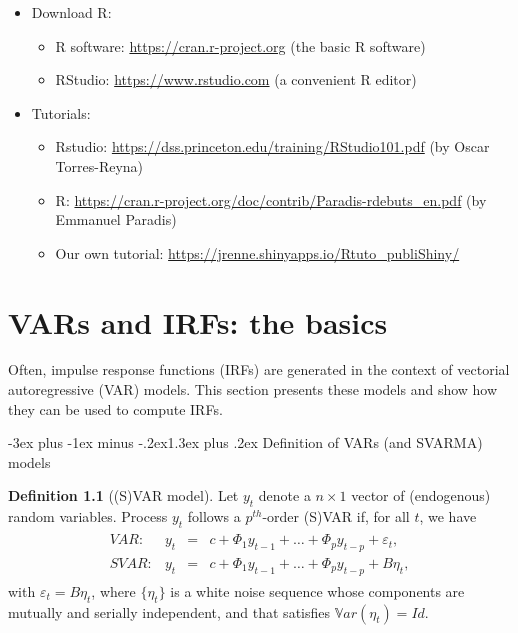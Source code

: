 \documentclass[
  11pt,
]{book}
\makeatletter
\providecommand{\tightlist}{%
  \setlength{\itemsep}{0pt}\setlength{\parskip}{0pt}}
\renewcommand\section{\@startsection{section}{1}{\z@}
  {-3ex plus -1ex minus -.2ex}{1.3ex plus .2ex}
  {\normalfont\Large\bfseries\color{TextbookInk}}}
\theoremstyle{definition}
\newtheorem{definition}{Definition}[chapter]
\theoremstyle{definition}
\theoremstyle{definition}
\theoremstyle{definition}
\theoremstyle{remark}
\makeatother
\begin{document}
\begin{itemize}
\item
  Download R:

  \begin{itemize}
  \tightlist
  \item
    R software: \url{https://cran.r-project.org} (the basic R software)
  \item
    RStudio: \url{https://www.rstudio.com} (a convenient R editor)
  \end{itemize}
\item
  Tutorials:

  \begin{itemize}
  \tightlist
  \item
    Rstudio: \url{https://dss.princeton.edu/training/RStudio101.pdf} (by Oscar Torres-Reyna)
  \item
    R: \url{https://cran.r-project.org/doc/contrib/Paradis-rdebuts_en.pdf} (by Emmanuel Paradis)
  \item
    Our own tutorial: \url{https://jrenne.shinyapps.io/Rtuto_publiShiny/}
  \end{itemize}
\end{itemize}

\chapter{VARs and IRFs: the basics}\label{basics}

Often, impulse response functions (IRFs) are generated in the context of vectorial autoregressive (VAR) models. This section presents these models and show how they can be used to compute IRFs.

\section{Definition of VARs (and SVARMA) models}\label{definition-of-vars-and-svarma-models}

\begin{definition}[(S)VAR model]
\protect\hypertarget{def:SVAR}{}\label{def:SVAR}Let \(y_{t}\) denote a \(n \times1\) vector of (endogenous) random variables. Process \(y_{t}\) follows a \(p^{th}\)-order (S)VAR if, for all \(t\), we have
\begin{eqnarray}
\begin{array}{rllll}
VAR:& y_t &=& c + \Phi_1 y_{t-1} + \dots + \Phi_p y_{t-p} + \varepsilon_t,\\
SVAR:& y_t &=& c + \Phi_1 y_{t-1} + \dots + \Phi_p y_{t-p} + B \eta_t,
\end{array}
\label{eq:yVAR}
\end{eqnarray}
with \(\varepsilon_t = B\eta_t\), where \(\{\eta_{t}\}\) is a white noise sequence whose components are mutually and serially independent, and that satisfies \(\mathbb{V}ar(\eta_t)=Id\).
\end{definition}
\end{document}
